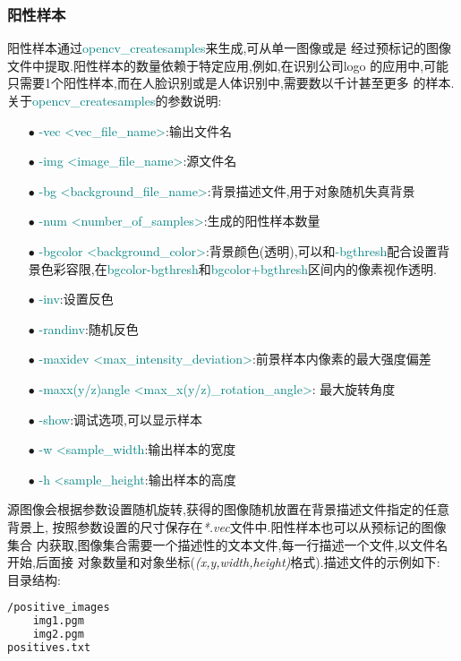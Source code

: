 \documentclass[10pt,technote]{IEEEtran}
\begin{document}
\subsubsection{阳性样本}
阳性样本通过\textcolor{teal}{opencv\_createsamples}来生成,可从单一图像或是
经过预标记的图像文件中提取.阳性样本的数量依赖于特定应用,例如,在识别公司logo
的应用中,可能只需要1个阳性样本,而在人脸识别或是人体识别中,需要数以千计甚至更多
的样本.关于\textcolor{teal}{opencv\_createsamples}的参数说明:
\begin{enumerate}
\item[$\bullet$]\textcolor{teal}{-vec <vec\_file\_name>}:输出文件名
\item[$\bullet$]\textcolor{teal}{-img <image\_file\_name>}:源文件名
\item[$\bullet$]\textcolor{teal}{-bg <background\_file\_name>}:背景描述文件,用于对象随机失真背景
\item[$\bullet$]\textcolor{teal}{-num <number\_of\_samples>}:生成的阳性样本数量
\item[$\bullet$]\textcolor{teal}{-bgcolor <background\_color>}:背景颜色(透明),可以和\textcolor{teal}{-bgthresh}配合设置背景色彩容限,在\textcolor{teal}{bgcolor-bgthresh}和\textcolor{teal}{bgcolor+bgthresh}区间内的像素视作透明.
\item[$\bullet$]\textcolor{teal}{-inv}:设置反色
\item[$\bullet$]\textcolor{teal}{-randinv}:随机反色
\item[$\bullet$]\textcolor{teal}{-maxidev <max\_intensity\_deviation>}:前景样本内像素的最大强度偏差
\item[$\bullet$]\textcolor{teal}{-maxx(y/z)angle <max\_x(y/z)\_rotation\_angle>}:
最大旋转角度
\item[$\bullet$]\textcolor{teal}{-show}:调试选项,可以显示样本
\item[$\bullet$]\textcolor{teal}{-w <sample\_width}:输出样本的宽度
\item[$\bullet$]\textcolor{teal}{-h <sample\_height}:输出样本的高度
\end{enumerate}
源图像会根据参数设置随机旋转,获得的图像随机放置在背景描述文件指定的任意背景上,
按照参数设置的尺寸保存在\textit{*.vec}文件中.阳性样本也可以从预标记的图像集合
内获取,图像集合需要一个描述性的文本文件,每一行描述一个文件,以文件名开始,后面接
对象数量和对象坐标(\textit{(x,y,width,height)}格式).描述文件的示例如下:\\
目录结构:
\begin{lstlisting}[language=bash]
/positive_images
	img1.pgm
	img2.pgm
positives.txt
\end{lstlisting}
\end{document}
